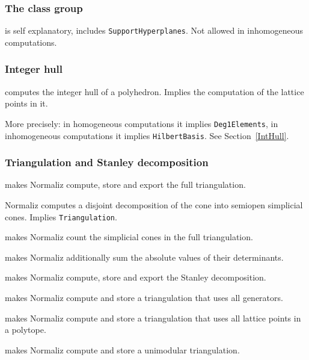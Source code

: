 \subsubsection{The class group}

\begin{itemize}
	\itemtt [ClassGroup, -C] is self explanatory, includes \verb|SupportHyperplanes|. Not allowed in inhomogeneous computations.
\end{itemize}

\subsubsection{Integer hull}

\begin{itemize}
	\itemtt [IntegerHull, -H] computes the integer hull of a polyhedron. Implies the computation of the lattice points in it.
\end{itemize}

More precisely: in homogeneous computations it implies \verb|Deg1Elements|, in inhomogeneous computations it implies \verb|HilbertBasis|. See Section~\ref{IntHull}.

\subsubsection{Triangulation and Stanley decomposition}

\begin{itemize}
	
	\itemtt[Triangulation, -T] makes Normaliz compute, store and export the full triangulation.
	
	\itemtt[ConeDecomposition, -D] Normaliz computes a disjoint decomposition of the cone into semiopen simplicial cones. Implies \verb|Triangulation|.
	
	\itemtt[TriangulationSize, -t] makes Normaliz count the simplicial cones in the full triangulation.
	
	\itemtt[TriangulationDetSum] makes Normaliz additionally sum the absolute values of their determinants.
	
	\itemtt[StanleyDec, -y] makes Normaliz compute, store and export the Stanley decomposition.
	
	\itemtt[AllGeneratorsTriangulation] makes Normaliz compute and store a triangulation that uses all generators.
	
	\itemtt[LatticePointTriangulation] makes Normaliz compute and store a triangulation that uses all lattice points in a polytope.
	
	\itemtt[UnimodularTriangulation] makes Normaliz compute and store a unimodular triangulation.
	
\end{itemize}

